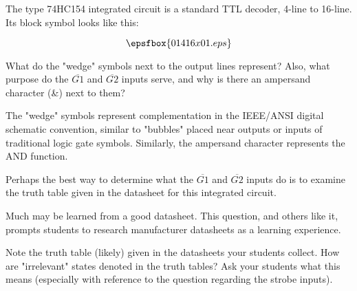 

The type 74HC154 integrated circuit is a standard TTL decoder, 4-line to 16-line.  Its block symbol looks like this:

$$\epsfbox{01416x01.eps}$$

What do the "wedge" symbols next to the output lines represent?  Also, what purpose do the $\overline{G1}$ and $\overline{G2}$ inputs serve, and why is there an ampersand character (\&) next to them?







The "wedge" symbols represent complementation in the IEEE/ANSI digital schematic convention, similar to "bubbles" placed near outputs or inputs of traditional logic gate symbols.  Similarly, the ampersand character represents the AND function.

Perhaps the best way to determine what the $\overline{G1}$ and $\overline{G2}$ inputs do is to examine the truth table given in the datasheet for this integrated circuit.







Much may be learned from a good datasheet.  This question, and others like it, prompts students to research manufacturer datasheets as a learning experience.

Note the truth table (likely) given in the datasheets your students collect.  How are "irrelevant" states denoted in the truth tables?  Ask your students what this means (especially with reference to the question regarding the strobe inputs).




